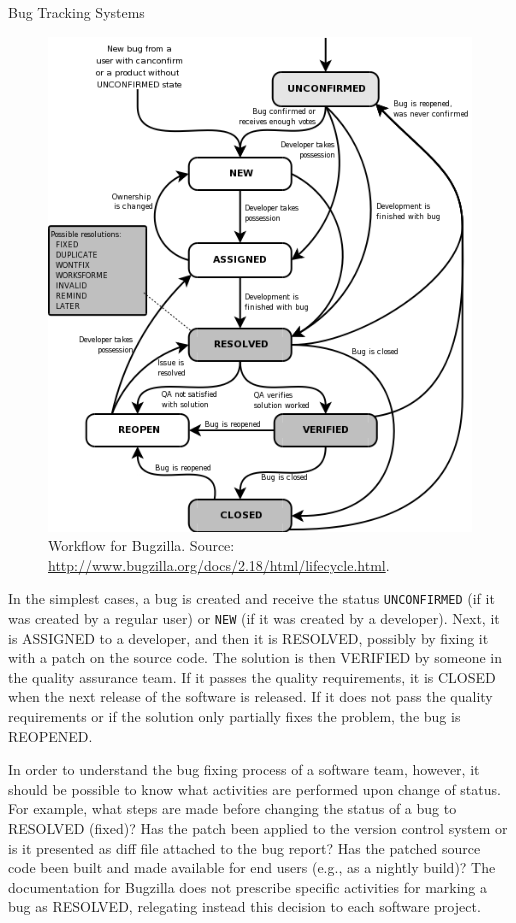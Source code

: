 \begin{subsection}{Bug Tracking Systems}
\begin{figure}[ht]
	\centering
		\includegraphics[scale=0.4]{bugzilla.png}
	\caption{Workflow for Bugzilla. Source: \url{http://www.bugzilla.org/docs/2.18/html/lifecycle.html}.}
	\label{fig:bugzilla}
\end{figure}

In the simplest cases, a bug is created and receive the status \texttt{UNCONFIRMED} (if it was created by a regular user) or \texttt{NEW} (if it was created by a developer). Next, it is ASSIGNED to a developer, and then it is RESOLVED, possibly by fixing it with a patch on the source code. The solution is then VERIFIED by someone in the quality assurance team. If it passes the quality requirements, it is CLOSED when the next release of the software is released. If it does not pass the quality requirements or if the solution only partially fixes the problem, the bug is REOPENED.

In order to understand the bug fixing process of a software team, however, it should be possible to know what activities are performed upon change of status. For example, what steps are made before changing the status of a bug to RESOLVED (fixed)? Has the patch been applied to the version control system or is it presented as diff file attached to the bug report? Has the patched source code been built and made available for end users (e.g., as a nightly build)? The documentation for Bugzilla does not prescribe specific activities for marking a bug as RESOLVED, relegating instead this decision to each software project.


\end{subsection}
